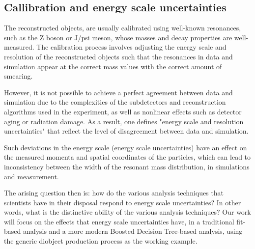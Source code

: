 \subsection{Callibration and energy scale uncertainties}
\label{sec:org41e8e4d}
The reconstructed objects, are usually calibrated using well-known resonances, such as the Z boson or J/psi meson, whose masses and decay properties are well-measured. The calibration process involves adjusting the energy scale and resolution of the reconstructed objects such that the resonances in data and simulation appear at the correct mass values with the correct amount of smearing.

However, it is not possible to achieve a perfect agreement between data and simulation due to the complexities of the subdetectors and reconstruction algorithms used in the experiment, as well as nonlinear effects such as detector aging or radiation damage. As a result, one defines "energy scale and resolution uncertainties" that reflect the level of disagreement between data and simulation.

Such deviations in the energy scale (energy scale uncertainties) have an effect on the measured momenta and spatial coordinates of the particles, which can lead to inconsistency between the width of the resonant mass distribution, in simulations and measurement.

The arising question then is: how do the various analysis techniques that scientists have in their disposal respond to energy scale uncertainties? In other words, what is the distinctive ability of the various analysis techniques? Our work will focus on the effects that energy scale uncertainties have, in a traditional fit-based analysis and a more modern Boosted Decision Tree-based analysis, using the generic diobject production process as the working example.

